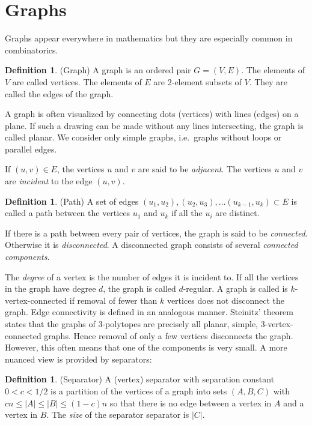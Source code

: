 \documentclass[a4paper,12pt]{book}
\theoremstyle{plain}
\theoremstyle{definition}
\newtheorem{definition}[theorem]{Definition}
\begin{document}
\section{Graphs}

Graphs appear everywhere in mathematics but they are especially common in 
combinatorics. 

\begin{definition}
(Graph) A graph is an ordered pair $G=(V,E)$. The elements of $V$ are called 
vertices. The elements of $E$ are 2-element subsets of $V$. They are called 
the edges of the graph. 
\end{definition}
A graph is often visualized by connecting dots (vertices) with lines (edges) on a plane. 
If such a drawing can be made without any lines intersecting, the graph is called
planar.
We consider only simple graphs, i.e.\ graphs without loops or parallel 
edges.

If $(u,v) \in E$, the vertices $u$ and $v$ are said to be \textit{adjacent}. 
The vertices $u$ and $v$ are \textit{incident} to the edge $(u,v)$. 
\begin{definition}
 (Path) A set of edges $(u_1, u_2), (u_2, u_3), \dots (u_{k-1}, u_k) \subset E$ 
is called a path between the vertices $u_1$ and $u_k$ if all the $u_i$ are 
distinct.
\end{definition}
If there is a path between every pair of vertices, the graph is said to be 
\textit{connected}. Otherwise it is \textit{disconnected}. A disconnected graph 
consists of several \textit{connected components}.

The \textit{degree} of a vertex is the number of edges it is incident to. 
If all the vertices in the graph have degree $d$, the graph is called 
$d$-regular. A graph is called is $k$-vertex-connected if removal of fewer than 
$k$ vertices does not disconnect the graph. Edge connectivity is defined in an 
analogous manner. Steinitz' theorem states that the graphs of 
3-polytopes are precisely all planar, simple, 3-vertex-connected graphs. Hence 
removal of only a few vertices disconnects the graph. However, this
often means that one of the components is very small. A more nuanced view is 
provided 
by separators:

\begin{definition}
(Separator) A (vertex) separator with separation constant $0<c<1/2$ is a 
partition of the vertices of a graph into 
sets $(A,B,C)$  with $cn \le |A| \le |B| \le (1-c)n$ so that there is no edge between 
a vertex in $A$ and a vertex in $B$. The \textit{size} of the separator
separator is $|C|$.  
\end{definition}
\end{document}
